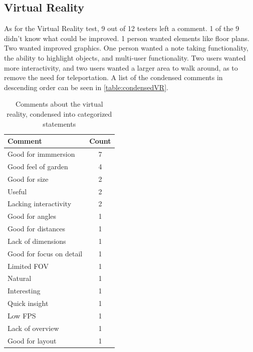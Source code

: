 \subsection*{Virtual Reality}
	As for the Virtual Reality test, 9 out of 12 testers left a comment. 1 of the 9 didn't know what could be improved. 1 person wanted elements like floor plans. Two wanted improved graphics. One person wanted a note taking functionality, the ability to highlight objects, and multi-user functionality. Two users wanted more interactivity, and two users wanted a larger area to walk around, as to remove the need for teleportation. A list of the condensed comments in descending order can be seen in \autoref{table:condensedVR}.
	\begin{table}[H]
		\centering
		\caption{Comments about the virtual reality, condensed into categorized statements}
		\label{table:condensedVR}
		\begin{tabular}{p{5cm}|c}
			Comment & Count \\ \hline
			Good for immmersion & 7 \\
			Good feel of garden & 4 \\
			Good for size  & 2 \\
			Useful & 2 \\
			Lacking interactivity & 2 \\
			Good for angles & 1 \\
			Good for distances& 1 \\
			Lack of dimensions& 1 \\
			Good for focus on detail& 1 \\
			Limited FOV& 1 \\
			Natural& 1 \\
			Interesting& 1 \\
			Quick insight& 1 \\
			Low FPS& 1 \\
			Lack of overview& 1 \\
			Good for layout& 1 \\
			
		\end{tabular}
		
	\end{table}

